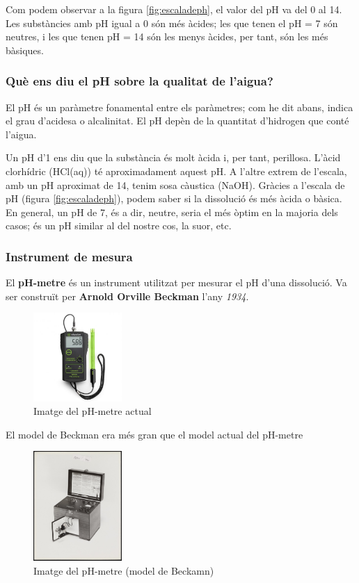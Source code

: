 Com podem observar a la figura \ref{fig:escaladeph}, el valor del pH va del 0 al 14. Les substàncies amb pH igual a 0 són més àcides; les que tenen el pH = 7 són neutres, i les que tenen pH = 14 són les menys àcides, per tant, són les més bàsiques.

\subsubsection{Què ens diu el pH sobre la qualitat de l'aigua?}
El pH és un paràmetre fonamental entre els paràmetres; com he dit abans, indica el grau d'acidesa o alcalinitat. El pH depèn de la quantitat d'hidrogen que conté l'aigua.

Un pH d'1 ens diu que la substància és molt àcida i, per tant, perillosa. L'àcid clorhídric (HCl(aq)) té aproximadament aquest pH. A l'altre extrem de l'escala, amb un pH aproximat de 14, tenim sosa càustica (NaOH). Gràcies a l'escala de pH (figura \ref{fig:escaladeph}), podem saber si la dissolució és més àcida o bàsica. En general, un pH de 7, és a dir, neutre, seria el més òptim en la majoria dels casos; és un pH similar al del nostre cos, la suor, etc.
\subsubsection{Instrument de mesura}
El \textbf{pH-metre} és un instrument utilitzat per mesurar el pH d’una dissolució. Va ser construït per \textbf{Arnold Orville Beckman} l’any \textit{1934}.
\begin{figure}[H]
\centering
\includegraphics[width=0.3\textwidth]{./Figures/pHmetre.png}
\caption{Imatge del pH-metre actual}
\label{fig:pH-metre}
\end{figure}
El model de Beckman era més gran que el model actual del pH-metre
\begin{figure}[H]
\centering
\includegraphics[width=0.3\textwidth]{./Figures/modelbeckman.png}
\caption{Imatge del pH-metre (model de Beckamn)}
\label{fig:pH-metre}
\end{figure}

